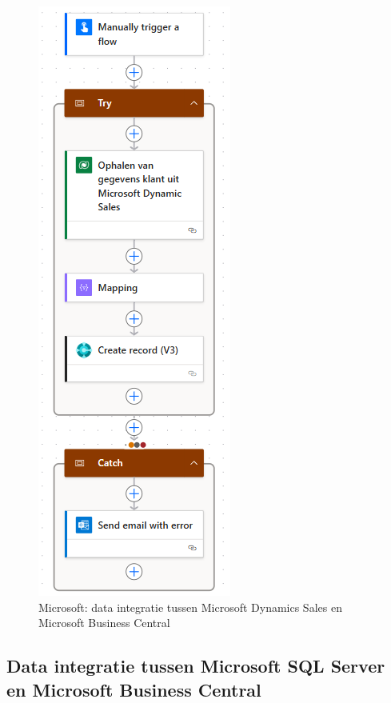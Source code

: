 \begin{figure}[H]
    \centering
    \includegraphics[]{../bachproef/images/Microsoft_Quote_Creation.png}
    \caption{Microsoft: data integratie tussen Microsoft Dynamics Sales en Microsoft Business Central}
\end{figure}

\subsection{Data integratie tussen Microsoft SQL Server en Microsoft Business Central}
\label{ch:Microsoft3}

